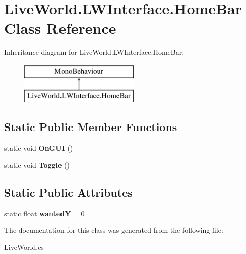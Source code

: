 \hypertarget{class_live_world_1_1_l_w_interface_1_1_home_bar}{}\section{Live\+World.\+L\+W\+Interface.\+Home\+Bar Class Reference}
\label{class_live_world_1_1_l_w_interface_1_1_home_bar}
Inheritance diagram for Live\+World.\+L\+W\+Interface.\+Home\+Bar\+:\begin{figure}[H]
\begin{center}
\leavevmode
\includegraphics[height=2.000000cm]{class_live_world_1_1_l_w_interface_1_1_home_bar}
\end{center}
\end{figure}
\subsection*{Static Public Member Functions}
\begin{DoxyCompactItemize}
\item 
\hypertarget{class_live_world_1_1_l_w_interface_1_1_home_bar_a3ef53be3eec64ea5900561ecfb8157f8}{}static void {\bfseries On\+G\+U\+I} ()\label{class_live_world_1_1_l_w_interface_1_1_home_bar_a3ef53be3eec64ea5900561ecfb8157f8}

\item 
\hypertarget{class_live_world_1_1_l_w_interface_1_1_home_bar_ae7a63c32d2d5f4d67c210acbc60561bd}{}static void {\bfseries Toggle} ()\label{class_live_world_1_1_l_w_interface_1_1_home_bar_ae7a63c32d2d5f4d67c210acbc60561bd}

\end{DoxyCompactItemize}
\subsection*{Static Public Attributes}
\begin{DoxyCompactItemize}
\item 
\hypertarget{class_live_world_1_1_l_w_interface_1_1_home_bar_aa3cd55f33c9a33402606b8a67ed6f710}{}static float {\bfseries wanted\+Y} = 0\label{class_live_world_1_1_l_w_interface_1_1_home_bar_aa3cd55f33c9a33402606b8a67ed6f710}

\end{DoxyCompactItemize}


The documentation for this class was generated from the following file\+:\begin{DoxyCompactItemize}
\item 
Live\+World.\+cs\end{DoxyCompactItemize}
